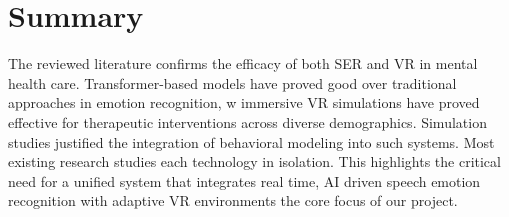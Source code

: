 \section{Summary}
The reviewed literature confirms the efficacy of both SER and VR in mental health care. Transformer-based models have proved good over traditional approaches in emotion recognition, w immersive VR simulations have proved effective for therapeutic interventions across diverse demographics. Simulation studies justified the integration of behavioral modeling into such systems. Most existing research studies each technology in isolation. This highlights the critical need for a unified system that integrates real time, AI driven speech emotion recognition with adaptive VR environments the core focus of our project.
